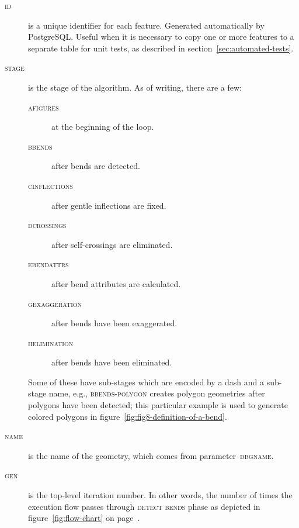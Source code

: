 \documentclass[a4paper]{article}
\newcommand{\onpage}[1]{\ref{#1} on page~\pageref{#1}}
\begin{document}
\begin{description}

    \item[\normalfont\textsc{id}] is a unique identifier for each feature.
        Generated automatically by PostgreSQL. Useful when it is necessary to
        copy one or more features to a separate table for unit tests, as
        described in section~\ref{sec:automated-tests}.

    \item[\normalfont\textsc{stage}] is the stage of the algorithm. As of
        writing, there are a few:
        \begin{description}
            \item[\normalfont\textsc{afigures}] at the beginning of the loop.
            \item[\normalfont\textsc{bbends}] after bends are detected.

            \item[\normalfont\textsc{cinflections}] after gentle inflections
                are fixed.

            \item[\normalfont\textsc{dcrossings}] after self-crossings are
                eliminated.

            \item[\normalfont\textsc{ebendattrs}] after bend attributes are
                calculated.

            \item[\normalfont\textsc{gexaggeration}] after bends have been
                exaggerated.

            \item[\normalfont\textsc{helimination}] after bends have been
                eliminated.

        \end{description}

        Some of these have sub-stages which are encoded by a dash and a
        sub-stage name, e.g., \textsc{bbends-polygon} creates polygon
        geometries after polygons have been detected; this particular example
        is used to generate colored polygons in
        figure~\ref{fig:fig8-definition-of-a-bend}.

    \item[\normalfont\textsc{name}] is the name of the geometry, which comes from
        parameter~\textsc{dbgname}.

    \item[\normalfont\textsc{gen}] is the top-level iteration number. In other
        words, the number of times the execution flow passes through
        \textsc{detect bends} phase as depicted in
        figure~\onpage{fig:flow-chart}.


\end{description}
\end{document}
